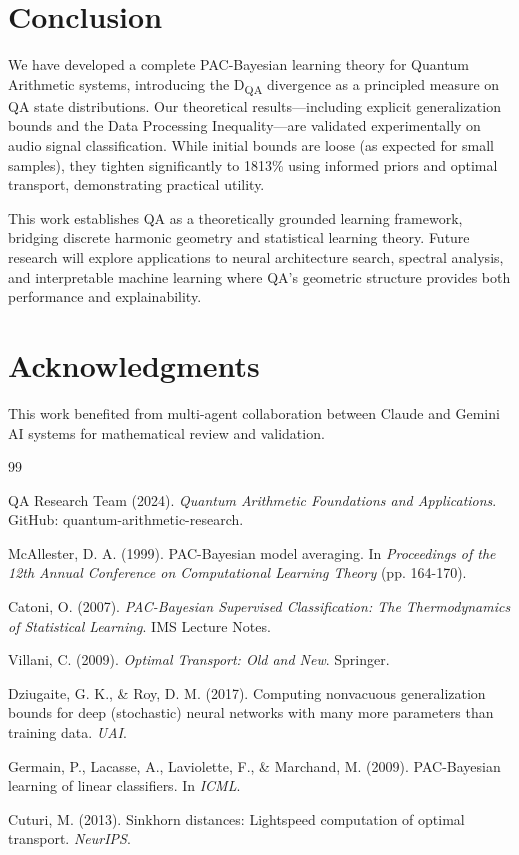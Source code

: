 \documentclass[11pt]{article}
\theoremstyle{remark}
\begin{document}
\section{Conclusion}

We have developed a complete PAC-Bayesian learning theory for Quantum Arithmetic systems, introducing the D\textsubscript{QA} divergence as a principled measure on QA state distributions. Our theoretical results—including explicit generalization bounds and the Data Processing Inequality—are validated experimentally on audio signal classification. While initial bounds are loose (as expected for small samples), they tighten significantly to 1813\% using informed priors and optimal transport, demonstrating practical utility.

This work establishes QA as a theoretically grounded learning framework, bridging discrete harmonic geometry and statistical learning theory. Future research will explore applications to neural architecture search, spectral analysis, and interpretable machine learning where QA's geometric structure provides both performance and explainability.

\section*{Acknowledgments}

This work benefited from multi-agent collaboration between Claude and Gemini AI systems for mathematical review and validation.

\begin{thebibliography}{99}

QA Research Team (2024). \emph{Quantum Arithmetic Foundations and Applications}. GitHub: quantum-arithmetic-research.

McAllester, D. A. (1999). PAC-Bayesian model averaging. In \emph{Proceedings of the 12th Annual Conference on Computational Learning Theory} (pp. 164-170).

Catoni, O. (2007). \emph{PAC-Bayesian Supervised Classification: The Thermodynamics of Statistical Learning}. IMS Lecture Notes.

Villani, C. (2009). \emph{Optimal Transport: Old and New}. Springer.

Dziugaite, G. K., \& Roy, D. M. (2017). Computing nonvacuous generalization bounds for deep (stochastic) neural networks with many more parameters than training data. \emph{UAI}.

Germain, P., Lacasse, A., Laviolette, F., \& Marchand, M. (2009). PAC-Bayesian learning of linear classifiers. In \emph{ICML}.

Cuturi, M. (2013). Sinkhorn distances: Lightspeed computation of optimal transport. \emph{NeurIPS}.

\end{thebibliography}
\end{document}
